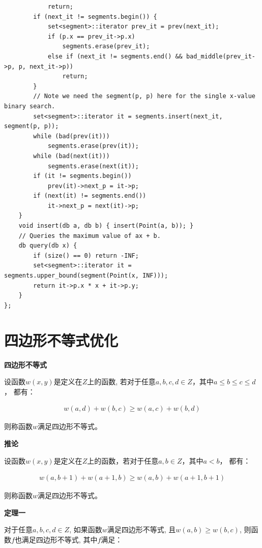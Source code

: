 \begin{lstlisting}
            return;
        if (next_it != segments.begin()) {
            set<segment>::iterator prev_it = prev(next_it);
            if (p.x == prev_it->p.x)
                segments.erase(prev_it);
            else if (next_it != segments.end() && bad_middle(prev_it->p, p, next_it->p))
                return;
        }
        // Note we need the segment(p, p) here for the single x-value binary search.
        set<segment>::iterator it = segments.insert(next_it, segment(p, p));
        while (bad(prev(it)))
            segments.erase(prev(it));
        while (bad(next(it)))
            segments.erase(next(it));
        if (it != segments.begin())
            prev(it)->next_p = it->p;
        if (next(it) != segments.end())
            it->next_p = next(it)->p;
    }
    void insert(db a, db b) { insert(Point(a, b)); }
    // Queries the maximum value of ax + b.
    db query(db x) {
		if (size() == 0) return -INF;
        set<segment>::iterator it = segments.upper_bound(segment(Point(x, INF)));
      	return it->p.x * x + it->p.y;
    }
};
\end{lstlisting}

\section{四边形不等式优化}

\textbf{四边形不等式}

设函数$w(x, y)$是定义在$Z$上的函数, 若对于任意$a, b, c, d \in Z$，其中$a \leq b \leq c \leq d$， 都有：

\begin{eqnarray*}
w(a,d)+w(b,c)\ge w(a,c)+w(b,d)
\end{eqnarray*}

则称函数$w$满足四边形不等式。\par

\textbf{推论}\par

设函数$w(x, y)$是定义在$Z$上的函数，若对于任意$a, b \in Z$，其中$a < b$， 都有：

\begin{eqnarray*}
w(a, b + 1) + w(a + 1, b) \geq w(a, b) + w(a + 1, b + 1)
\end{eqnarray*}

则称函数$w$满足四边形不等式。\par

\textbf{定理一}\par

对于任意$a, b, c, d \in Z$, 如果函数$w$满足四边形不等式, 且$w(a, b) \geq w(b, c)$, 则函数$f$也满足四边形不等式, 其中$f$满足：

